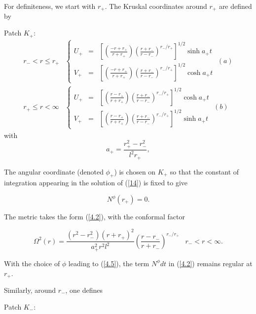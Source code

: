 \documentclass[12pt]{article}
\newcounter{c1} \newcounter{c2}
\newcommand{\bb}{\begin{equation}}
\newcommand{\ee}{\end{equation}}
\begin{document}
For definiteness, we start with $r_+$. The Kruskal coordinates
around $r_{+}$ are defined by

Patch $K_{+}$:
\begin{equation} \begin{array}{cl}
r_{-} <r \leq r_{+} & \left\{ \begin{array}{lcr}
U_{+} &=& \left[ \left( \frac{-r+r_{+}}{r+r_{+}} \right)\left(
\frac{r+r_{-}}{r-r_{-}} \right)^{r_{-}/r_{+}} \right]^{1/2}
\sinh a_{+} t  \\
V_{+} &=& \left[ \left( \frac{-r+r_{+}}{r+r_{+}} \right)\left(
\frac{r+r_{-}}{r-r_{-}} \right)^{r_{-}/r_{+}} \right]^{1/2}
\cosh a_{+} t
 \end{array}  \right. \; (a) \\
r_{+} \leq  r < \infty  & \left\{  \begin{array}{lcr}
U_{+} &=& \left[ \left( \frac{r-r_+}{r+r_+} \right)\left(
\frac{r+r_{-}}{r-r_{-}} \right)^{r_{-}/r_{+}} \right]^{1/2}
\cosh a_+ t \\
V_{+} &=& \left[ \left( \frac{r-r_+}{r+r_+} \right)\left(
\frac{r+r_{-}}{r-r_{-}} \right)^{r_{-}/r_{+}} \right]^{1/2}
\sinh a_+ t
\end{array}  \right. \;(b)
\end{array} \label{4.3}
\end{equation}
%
with
%
\bb
a_{+} = \frac{r_{+}^2 - r_{-}^2}{l^2 r_{+}},
\label{4.4}
\ee

The angular coordinate (denoted $\phi_{+}$) is chosen on
$K_{+}$ so that the constant of integration
appearing in the solution of (\ref{14}) is fixed to give

\bb
N^{\phi}(r_{+})=0.
\label{4.5}
\ee

The metric takes the form (\ref{4.2}), with the conformal factor

\begin{equation}
\Omega^2 (r)= \frac{(r^2-r_{-}^2)(r+r_{+})^2}{a_{+}^2 r^2 l^2} \left(
\frac{r-r_{-}}{r+r_{-}} \right)^{r_{-}/r_{+}} \;\;\;  r_{-}
< r <\infty .
\label{4.6}
\end{equation}

With the choice of $\phi$ leading to (\ref{4.5}), the term
$N^{\phi} dt$ in (\ref{4.2}) remains regular at $r_+$.

Similarly, around $r_{-}$, one defines

Patch $K_{-}$:
\end{document}
